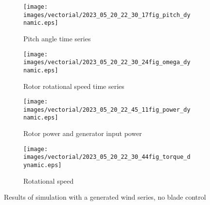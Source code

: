 \begin{figure}[htb]
  \begin{subfigure}{0.5\columnwidth}
    \centering
    \texttt{[image: images/vectorial/2023\_05\_20\_22\_30\_17fig\_pitch\_dynamic.eps]}
    \caption{Pitch angle time series}
    \label{fig:pitch_dynamic_no_ctrl}
  \end{subfigure}
  \begin{subfigure}{0.5\columnwidth}
    \centering
    \texttt{[image: images/vectorial/2023\_05\_20\_22\_30\_24fig\_omega\_dynamic.eps]}
    \caption{Rotor rotational speed time series}
    \label{fig:omega_dynamic_no_ctrl}
  \end{subfigure}
  \begin{subfigure}{0.5\columnwidth}
    \centering
    \texttt{[image: images/vectorial/2023\_05\_20\_22\_45\_11fig\_power\_dynamic.eps]}
    \caption{Rotor power and generator input power}
    \label{fig:power_dynamic_no_ctrl}
  \end{subfigure}
  \begin{subfigure}{0.5\columnwidth}
    \centering
    \texttt{[image: images/vectorial/2023\_05\_20\_22\_30\_44fig\_torque\_dynamic.eps]}
    \caption{Rotational speed}
    \label{fig:torque_dynamic_no_ctrl}
  \end{subfigure}
  \caption{Results of simulation with a generated wind series, no blade control}
  \label{fig:simulation_rand_wind_no_pitch_control}
\end{figure}

